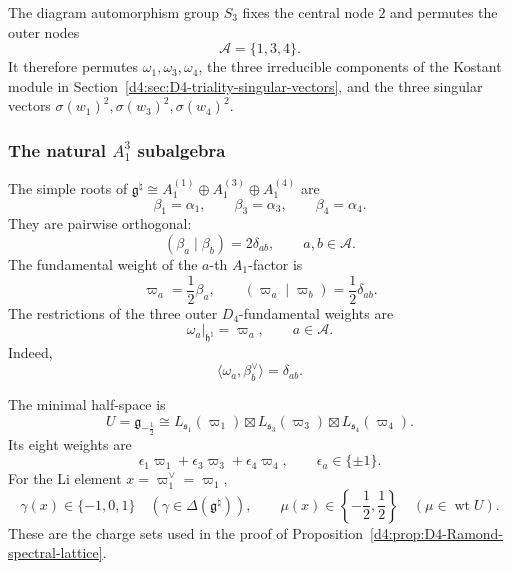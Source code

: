 \documentclass[11pt,reqno]{amsart}
\theoremstyle{definition}
\theoremstyle{remark}
\begin{document}
The diagram automorphism group \(S_3\) fixes the central node \(2\) and
permutes the outer nodes
\begin{equation*}
  \mathcal A=\{1,3,4\}.
\end{equation*}
It therefore permutes
\(\omega_1,\omega_3,\omega_4\), the three irreducible components of the
Kostant module in Section~\ref{d4:sec:D4-triality-singular-vectors}, and
the three singular vectors
\(\sigma(w_1)^2,\sigma(w_3)^2,\sigma(w_4)^2\).

\subsubsection{The natural \texorpdfstring{\(A_1^3\)}{A1 cubed} subalgebra}


The simple roots of
\(\mathfrak g^\natural\cong
 A_1^{(1)}\oplus A_1^{(3)}\oplus A_1^{(4)}\)
are
\begin{equation*}
  \beta_1=\alpha_1,\qquad
  \beta_3=\alpha_3,\qquad
  \beta_4=\alpha_4.
\end{equation*}
They are pairwise orthogonal:
\begin{equation*}
  (\beta_a\mid\beta_b)=2\delta_{ab},
  \qquad a,b\in\mathcal A.
\end{equation*}
The fundamental weight of the \(a\)-th \(A_1\)-factor is
\begin{equation*}
  \varpi_a=\frac12\beta_a,
  \qquad
  (\varpi_a\mid\varpi_b)=\frac12\delta_{ab}.
\end{equation*}
The restrictions of the three outer \(D_4\)-fundamental weights are
\begin{equation*}
  \omega_a\big|_{\mathfrak h^\natural}=\varpi_a,
  \qquad a\in\mathcal A.
\end{equation*}
Indeed,
\[
  \langle\omega_a,\beta_b^\vee\rangle=\delta_{ab}.
\]

The minimal half-space is
\begin{equation*}
  U=\mathfrak g_{-\frac12}
  \cong
  L_{\mathfrak s_1}(\varpi_1)
  \boxtimes
  L_{\mathfrak s_3}(\varpi_3)
  \boxtimes
  L_{\mathfrak s_4}(\varpi_4).
\end{equation*}
Its eight weights are
\begin{equation*}
  \epsilon_1\varpi_1+
  \epsilon_3\varpi_3+
  \epsilon_4\varpi_4,
  \qquad
  \epsilon_a\in\{\pm1\}.
\end{equation*}
For the Li element \(x=\varpi_1^\vee=\varpi_1\),
\begin{equation*}
  \gamma(x)\in\{-1,0,1\}
  \quad(\gamma\in\Delta(\mathfrak g^\natural)),
  \qquad
  \mu(x)\in\left\{-\frac12,\frac12\right\}
  \quad(\mu\in\operatorname{wt}U).
\end{equation*}
These are the charge sets used in the proof of
Proposition~\ref{d4:prop:D4-Ramond-spectral-lattice}.
\end{document}
